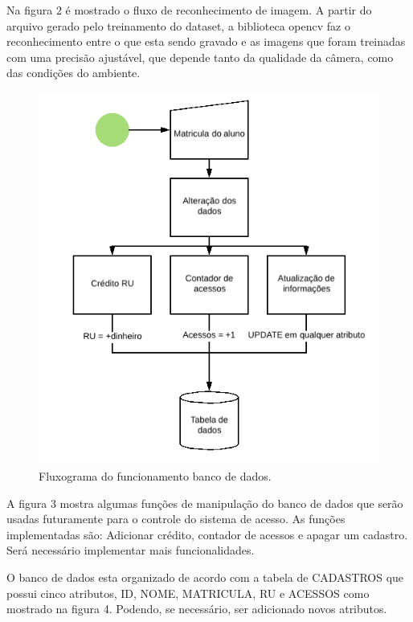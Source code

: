 \documentclass[conference,compsoc]{IEEEtran}
\begin{document}
Na figura 2 é mostrado o fluxo de reconhecimento de imagem. A partir do arquivo gerado pelo treinamento do dataset, a biblioteca opencv faz o reconhecimento entre o que esta sendo gravado e as imagens que foram treinadas com uma precisão ajustável, que depende tanto da qualidade da câmera, como das condições do ambiente. 

\begin{figure}[!ht]
		\centering
		\includegraphics[scale=0.25]{Banco_de_dados.png}
		\caption{Fluxograma do funcionamento banco de dados.}
\end{figure}

A figura 3 mostra algumas funções de manipulação do banco de dados que serão usadas futuramente para o controle do sistema de acesso. As funções implementadas são: Adicionar crédito, contador de acessos e apagar um cadastro. Será necessário implementar mais funcionalidades.

O banco de dados esta organizado de acordo com a tabela de CADASTROS que possui cinco atributos, ID, NOME, MATRICULA, RU e ACESSOS como mostrado na figura 4. Podendo, se necessário, ser adicionado novos atributos.  
\end{document}

